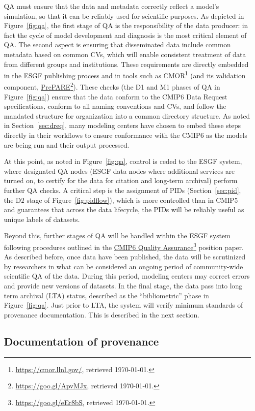 \documentclass[gmd,manuscript]{copernicus}
\newcommand{\pllabel}[1]{\label{p-#1}\linelabel{l-#1}}
\newcommand{\urlref}[2] {\href{#1}{#2}\footnote{\url{#1}, retrieved \today.}}
\begin{document}
QA must ensure that the data and metadata correctly reflect a model's
simulation, so that it can be reliably used for scientific purposes.
As depicted in Figure~\ref{fig:qa}, the first stage of QA is the
responsibility of the data producer: in fact the cycle of model
development and diagnosis is the most critical element of QA. The
second aspect is ensuring that disseminated data include common
metadata based on common CVs, which will enable consistent treatment
of data from different groups and institutions. These requirements are
directly embedded in the ESGF publishing process and in tools such as
\urlref{https://cmor.llnl.gov/}{CMOR} (and its validation component,
\urlref{https://goo.gl/ApvMJx}{PrePARE}). These checks (the D1 and M1
phases of QA in Figure~\ref{fig:qa}) ensure that the data conform to
the CMIP6 Data Request specifications, conform to all naming
conventions and CVs, and follow the mandated structure for
organization into a common directory structure. As noted in
Section~\ref{sec:dreq}, many modeling centers have chosen to embed
these steps directly in their workflows to ensure conformance with the
CMIP6 as the models are being run and their output processed.

At this point, as noted in Figure~\ref{fig:qa}, control is ceded to
the ESGF system, where designated QA nodes
\pllabel{RC1-51}
(ESGF data nodes where additional services are turned on, to certify
for the data for citation and long-term archival) perform further QA
checks. A critical step is the assignment of PIDs
(Section~\ref{sec:pid}, the D2 stage of Figure~\ref{fig:pidflow}),
which is more controlled than in CMIP5 and guarantees that across the
data lifecycle, the PIDs will be reliably useful as unique labels of
datasets.

Beyond this, further stages of QA will be handled within the ESGF
system following procedures outlined in the
\urlref{https://goo.gl/eEr8bS}{CMIP6 Quality Assurance} position
paper. As described before, once data have been published, the data
will be scrutinized by researchers in what can be considered an
ongoing period of community-wide scientific QA of the data. During
this period, modeling centers may correct errors and provide new
versions of datasets. In the final stage, the data pass into long term
archival (LTA) status, described as the ``bibliometric'' phase in
Figure~\ref{fig:qa}. Just prior to LTA, the system will verify minimum
standards of provenance documentation. This is described in the next
section.

\subsection{Documentation of provenance}
\label{sec:doc}
\end{document}
